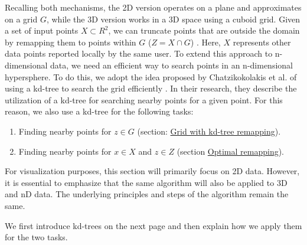 Recalling both mechanisms, the 2D version operates on a plane and approximates on a grid $G$, while the 3D version works in a 3D space using a cuboid grid.
Given a set of input points $X \subset R^2$, we can truncate points that are outside the domain by remapping them to points within $G$ ($Z = X \cap G$) \citep{DBLP:journals/corr/abs-1212-1984}.
Here, $X$ represents other data points reported locally by the same user.
To extend this approach to n-dimensional data, we need an efficient way to search points in an n-dimensional hypersphere.
To do this, we adopt the idea proposed by Chatzikokolakis et al. of using a kd-tree to search the grid efficiently \citep{chatzikokolakis_efficient_2017}.
In their research, they describe the utilization of a kd-tree for searching nearby points for a given point.
For this reason, we also use a kd-tree for the following tasks:
\begin{enumerate}
  \item Finding nearby points for $z \in G$ (section: \hyperref[theory:grid-remapping]{Grid with kd-tree remapping}).
  \item Finding nearby points for $x \in X$ and $z \in Z$ (section \hyperref[theory:optimal-remapping]{Optimal remapping}).
\end{enumerate}
For visualization purposes, this section will primarily focus on 2D data.
However, it is essential to emphasize that the same algorithm will also be applied to 3D and nD data.
The underlying principles and steps of the algorithm remain the same.

We first introduce kd-trees on the next page and then explain how we apply them for the two tasks.

\newpage
